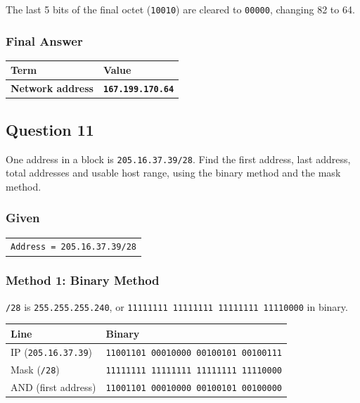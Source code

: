 \documentclass[11pt,a4paper]{article}
\begin{document}
The last 5 bits of the final octet (\texttt{10010}) are cleared to
\texttt{00000}, changing 82 to 64.

\subsubsection*{Final Answer}

\begin{tabularx}{\textwidth}{@{}lX@{}}
\toprule
\rowcolor{tablehead}\textbf{Term} & \textbf{Value} \\
\midrule
\textbf{Network address} & \textbf{\texttt{167.199.170.64}} \\
\bottomrule
\end{tabularx}

\subsection*{Question 11}

One address in a block is \texttt{205.16.37.39/28}. Find the first address, last address,
total addresses and usable host range, using the binary method and the mask method.

\subsubsection*{Given}

\begin{tabularx}{\textwidth}{@{}X@{}}
\texttt{Address = 205.16.37.39/28} \\
\end{tabularx}

\subsubsection*{Method 1: Binary Method}

\texttt{/28} is \texttt{255.255.255.240}, or
\texttt{11111111 11111111 11111111 11110000} in binary.

\begin{tabularx}{\textwidth}{@{}lX@{}}
\toprule
\rowcolor{tablehead}\textbf{Line} & \textbf{Binary} \\
\midrule
IP (\texttt{205.16.37.39}) & \texttt{11001101 00010000 00100101 00100111} \\
Mask (\texttt{/28}) & \texttt{11111111 11111111 11111111 11110000} \\
AND (first address) & \texttt{11001101 00010000 00100101 00100000} \\
\bottomrule
\end{tabularx}
\end{document}
